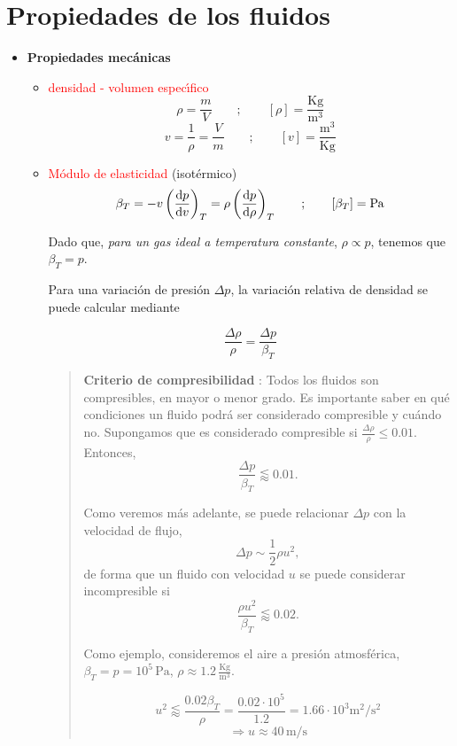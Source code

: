 \section{Propiedades de los fluidos}
\begin{itemize}
	\item \textbf{Propiedades mec\'anicas}
	\begin{itemize}
		\item{\textcolor{red}{densidad - volumen espec\'{\i}fico}}
		$$
		\rho = \frac{m}{V} \qquad ; \qquad \left[\rho\right] = \frac{\textrm{Kg}}{\textrm{m}^3}
		$$
		$$
		v = \frac{1}{\rho} = \frac{V}{m} \qquad ; \qquad \left[v\right] = \frac{\textrm{m}^3}{\textrm{Kg}}
		$$
		\item{\textcolor{red}{M\'odulo de elasticidad} (isot\'ermico)}
		$$
		\beta_T = -v \left(\frac{\textrm{d} p}{\textrm{d} v}\right)_T = \rho \left(\frac{\textrm{d} p}{\textrm{d} \rho}\right)_T \qquad ; \qquad \left[\beta_T\right] = \textrm{Pa}
		$$
		
		Dado que, \textit{para un gas ideal a temperatura constante}, $\rho \propto p$, tenemos que $\beta_T = p$.
		
		Para una variaci\'on de presi\'on $\Delta p$, la variaci\'on relativa de densidad se puede calcular mediante
		
		$$
		\frac{\Delta \rho}{\rho} = \frac{\Delta p}{\beta_T}
		$$
		
		
		\begin{quotation}
			\textbf{Criterio de compresibilidad} : Todos los fluidos son compresibles, en mayor o menor grado.
			Es importante saber en qu\'e condiciones  un fluido podr\'a ser considerado compresible y cu\'ando no. Supongamos que es considerado compresible si $\frac{\Delta \rho}{\rho} \leq 0.01$. Entonces,
			$$
			\frac{\Delta p}{\beta_T} \lessapprox 0.01.
			$$
			
			Como veremos m\'as adelante, se puede relacionar $\Delta p$ con la velocidad de flujo,
			$$
			\Delta p \sim \frac{1}{2} \rho u^2,
			$$
			de forma que un fluido con velocidad $u$ se puede considerar incompresible si
			$$
			\frac{\rho u^2}{\beta_T} \lessapprox 0.02.
			$$
			
			Como ejemplo, consideremos el aire a presi\'on atmosf\'erica, $ \beta_T = p = 10^5 \,\textrm{Pa}$,
			$\rho \approx 1.2 \,\frac{\textrm{Kg}}{\textrm{m}^3}$.
			
			$$ u^2 \lessapprox \frac{0.02 \beta_T}{\rho} = \frac{0.02 \cdot 10^5}{1.2} = 1.66 \cdot 10^3 \textrm{m}^2/\textrm{s}^2$$
			$$ \Rightarrow u \approx 40 \, \textrm{m/s} $$
			

\end{quotation}
\end{itemize}
\end{itemize}
